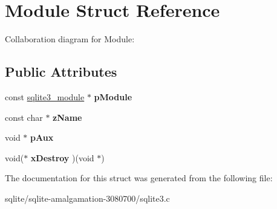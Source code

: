 \hypertarget{struct_module}{\section{Module Struct Reference}
\label{struct_module}
}


Collaboration diagram for Module\+:
\subsection*{Public Attributes}
\begin{DoxyCompactItemize}
\item 
\hypertarget{struct_module_a65d2539d71ea028b505b2fb33563bfd7}{const \hyperlink{structsqlite3__module}{sqlite3\+\_\+module} $\ast$ {\bfseries p\+Module}}\label{struct_module_a65d2539d71ea028b505b2fb33563bfd7}

\item 
\hypertarget{struct_module_a45a5f5b43926b8ebf3e13e46a6534810}{const char $\ast$ {\bfseries z\+Name}}\label{struct_module_a45a5f5b43926b8ebf3e13e46a6534810}

\item 
\hypertarget{struct_module_ae3b827fee4c8b4f3ff38c86c2e2f48cd}{void $\ast$ {\bfseries p\+Aux}}\label{struct_module_ae3b827fee4c8b4f3ff38c86c2e2f48cd}

\item 
\hypertarget{struct_module_a4be509110a1a2f2c06a5d69af45704ca}{void($\ast$ {\bfseries x\+Destroy} )(void $\ast$)}\label{struct_module_a4be509110a1a2f2c06a5d69af45704ca}

\end{DoxyCompactItemize}


The documentation for this struct was generated from the following file\+:\begin{DoxyCompactItemize}
\item 
sqlite/sqlite-\/amalgamation-\/3080700/sqlite3.\+c\end{DoxyCompactItemize}
